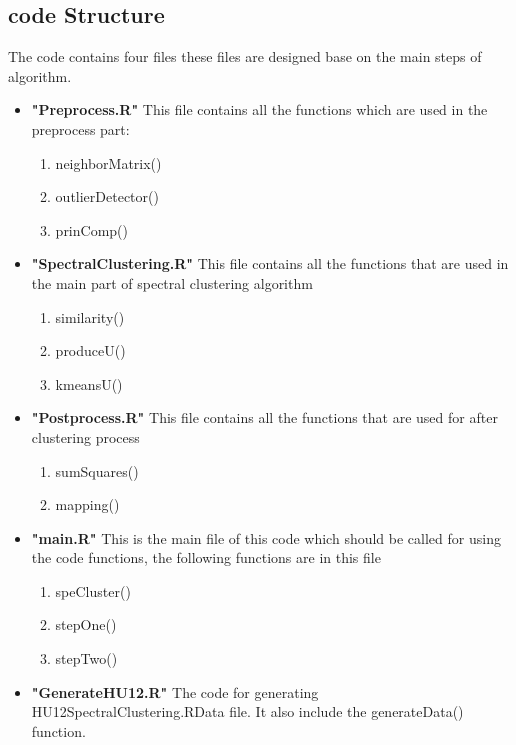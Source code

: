 \documentclass{article}
\begin{document}
\subsection {code Structure}
The code contains four files these files are designed base on the main steps of algorithm. 
\begin {itemize}
\item{\bf "Preprocess.R"} This file contains all the functions which are used in the preprocess part:
\begin{enumerate}
\item  neighborMatrix()
\item  outlierDetector()
\item  prinComp()
\end{enumerate}

\item{\bf "SpectralClustering.R"} This file contains all the functions that are used in the main part of spectral clustering algorithm 
\begin{enumerate}
\item  similarity()
\item  produceU()
\item  kmeansU()
\end{enumerate}

\item{\bf "Postprocess.R"} This file contains all the functions that are used for after clustering process
\begin{enumerate}
\item  sumSquares()
\item  mapping()
\end{enumerate}


\item {\bf "main.R"} This is the main file of this code which should be called for using the code functions, the following functions are in this file 
\begin{enumerate}
\item  speCluster()
\item  stepOne()
\item  stepTwo()
\end{enumerate}
\item {\bf "GenerateHU12.R"} The code for generating HU12SpectralClustering.RData file. It also include the generateData() function.
\end {itemize}
\end{document}
